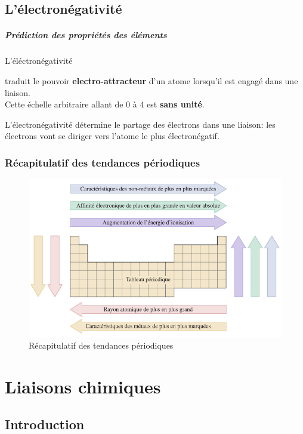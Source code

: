 \documentclass[10pt,a4paper]{book}
\begin{document}
\section{L'électronégativité}

\paragraph{Prédiction des propriétés des éléments} \hypertarget{electronegativity}{L'éléctronégativité} traduit le pouvoir \textbf{electro-attracteur} d'un atome lorsqu'il est engagé dans une liaison. \\
Cette échelle arbitraire allant de 0 à 4 est \textbf{sans unité}. \par
L'électronégativité détermine le partage des électrons dans une liaison: les électrons vont se diriger vers l'atome le plus électronégatif.

\subsection{Récapitulatif des tendances périodiques}

\begin{figure}[h!]
\begin{center}
\includegraphics[scale=0.75]{./assets/recap_tendencies.png}
\end{center}
\caption{Récapitulatif des tendances périodiques}
\label{fig:recap}
\end{figure}

\chapter{Liaisons chimiques}

\section{Introduction}
\end{document}
